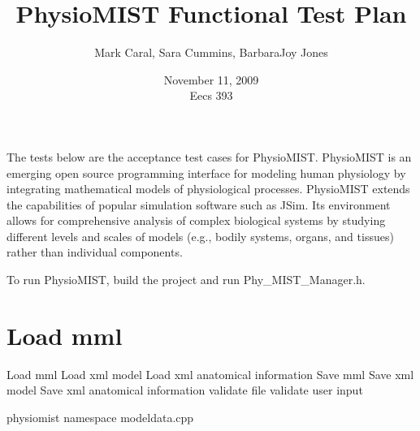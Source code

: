 \documentclass{article}
\title{PhysioMIST Functional Test Plan}
\author{Mark Caral, Sara Cummins, BarbaraJoy Jones}
\date{November 11, 2009\\{\sc Eecs} 393}
\begin{document}
\begin{titlepage}
\maketitle\thispagestyle{empty}
\end{titlepage}

The tests below are the acceptance test cases for PhysioMIST.
PhysioMIST is an emerging open source programming interface for modeling human physiology by integrating mathematical models of physiological processes.
PhysioMIST extends the capabilities of popular simulation software such as JSim.
Its environment allows for comprehensive analysis of complex biological systems by studying different levels and scales of models (e.g., bodily systems, organs, and tissues) rather than individual components.

To run PhysioMIST, build the project and run Phy_MIST_Manager.h.

\section{Load mml}
Load mml
Load xml model
Load xml anatomical information
Save mml
Save xml model
Save xml anatomical information
validate file
validate user input

physiomist namespace
modeldata.cpp
\end{document}
